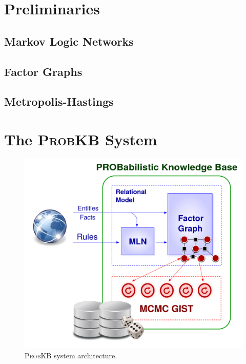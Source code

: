 \documentclass{vldb}
\newcommand{\probkb}{\textsc{ProbKB}\xspace}
\begin{document}
\section{Preliminaries}

\subsection{Markov Logic Networks}

\subsection{Factor Graphs}

\subsection{Metropolis-Hastings}

\section{The {\large{\probkb}} System}
\begin{figure}[ht]
  \centering
  \includegraphics[clip,trim=20 30 0 15,width=.9\columnwidth]{architecture.pdf}
  \caption{\probkb system architecture.}
  \label{fig:architecture}
\end{figure}
\end{document}
